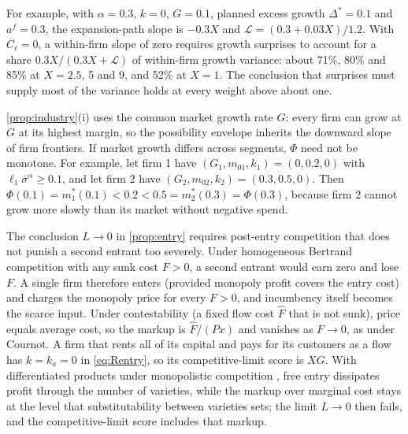 For example, with $\alpha=0.3$, $k=0$, $G=0.1$, planned excess growth $\Delta^*=0.1$ and $a^f=0.3$, the expansion-path slope is $-0.3X$ and $\mathcal L=(0.3+0.03X)/1.2$. With $C_\ell=0$, a within-firm slope of zero requires growth surprises to account for a share $0.3X/(0.3X+\mathcal L)$ of within-firm growth variance: about 71\%, 80\% and 85\% at $X=2.5$, 5 and 9, and 52\% at $X=1$. The conclusion that surprises must supply most of the variance holds at every weight above about one.

\begin{remark}\label{rem:segments}
\autoref{prop:industry}(i) uses the common market growth rate $G$: every firm can grow at $G$ at its highest margin, so the possibility envelope inherits the downward slope of firm frontiers. If market growth differs across segments, $\Phi$ need not be monotone. For example, let firm 1 have $(G_1,m_{01},k_1)=(0,0.2,0)$ with $\ell_1\bar\sigma^{\alpha}\ge 0.1$, and let firm 2 have $(G_2,m_{02},k_2)=(0.3,0.5,0)$. Then $\Phi(0.1)=m_1^*(0.1)<0.2<0.5=m_2^*(0.3)=\Phi(0.3)$, because firm 2 cannot grow more slowly than its market without negative spend.
\end{remark}

\begin{remark}\label{rem:bertrand}
The conclusion $L\to 0$ in \autoref{prop:entry} requires post-entry competition that does not punish a second entrant too severely. Under homogeneous Bertrand competition with any sunk cost $F>0$, a second entrant would earn zero and lose $F$. A single firm therefore enters (provided monopoly profit covers the entry cost) and charges the monopoly price for every $F>0$, and incumbency itself becomes the scarce input. Under contestability (a fixed flow cost $\hat F$ that is not sunk), price equals average cost, so the markup is $\hat F/(Px)$ and vanishes as $F\to 0$, as under Cournot. A firm that rents all of its capital and pays for its customers as a flow has $k=k_a=0$ in \eqref{eq:Rentry}, so its competitive-limit score is $XG$. With differentiated products under monopolistic competition \citep{dixit1977monopolistic}, free entry dissipates profit through the number of varieties, while the markup over marginal cost stays at the level that substitutability between varieties sets; the limit $L\to0$ then fails, and the competitive-limit score includes that markup.
\end{remark}

